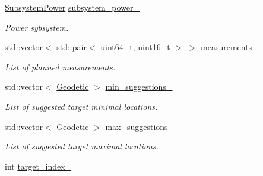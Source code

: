 \begin{DoxyCompactItemize}
\mbox{\label{classosse_1_1collaborate_1_1_node_afe26b3dbb589dcc9dc930280ce10707d}} 
\hyperlink{classosse_1_1collaborate_1_1_subsystem_power}{Subsystem\+Power} \hyperlink{classosse_1_1collaborate_1_1_node_afe26b3dbb589dcc9dc930280ce10707d}{subsystem\+\_\+power\+\_\+}
\begin{DoxyCompactList}\small\item\em Power sybsystem. \end{DoxyCompactList}\item 
\mbox{\label{classosse_1_1collaborate_1_1_node_af6e9839afd8e912ef1ac415185a2c72c}} 
std\+::vector$<$ std\+::pair$<$ uint64\+\_\+t, uint16\+\_\+t $>$ $>$ \hyperlink{classosse_1_1collaborate_1_1_node_af6e9839afd8e912ef1ac415185a2c72c}{measurements\+\_\+}
\begin{DoxyCompactList}\small\item\em List of planned measurements. \end{DoxyCompactList}\item 
\mbox{\label{classosse_1_1collaborate_1_1_node_af662492d5f497222dc9f6515ca8fb154}} 
std\+::vector$<$ \hyperlink{classosse_1_1collaborate_1_1_geodetic}{Geodetic} $>$ \hyperlink{classosse_1_1collaborate_1_1_node_af662492d5f497222dc9f6515ca8fb154}{min\+\_\+suggestions\+\_\+}
\begin{DoxyCompactList}\small\item\em List of suggested target minimal locations. \end{DoxyCompactList}\item 
\mbox{\label{classosse_1_1collaborate_1_1_node_a8ed02bda0f0ed137c303066ddb6bd508}} 
std\+::vector$<$ \hyperlink{classosse_1_1collaborate_1_1_geodetic}{Geodetic} $>$ \hyperlink{classosse_1_1collaborate_1_1_node_a8ed02bda0f0ed137c303066ddb6bd508}{max\+\_\+suggestions\+\_\+}
\begin{DoxyCompactList}\small\item\em List of suggested target maximal locations. \end{DoxyCompactList}\item 
\mbox{\label{classosse_1_1collaborate_1_1_node_a9d0a5d5634871c12f22c8da680b32ca0}} 
int \hyperlink{classosse_1_1collaborate_1_1_node_a9d0a5d5634871c12f22c8da680b32ca0}{target\+\_\+index\+\_\+}

\end{DoxyCompactItemize}
